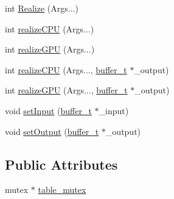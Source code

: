 \begin{DoxyCompactItemize}
int \hyperlink{class_fusion_1_1_dynamic_1_1_dynamic_dispatch_a9fafe72f2e1425c47f18bb3bab8601c4}{Realize} (Args...)
\item 
int \hyperlink{class_fusion_1_1_dynamic_1_1_dynamic_dispatch_a3e5d0db1df8ecf2376ef1a7073b3317f}{realize\-C\-P\-U} (Args...)
\item 
int \hyperlink{class_fusion_1_1_dynamic_1_1_dynamic_dispatch_a119f0f612ef66b521cb46dcdb2011b7a}{realize\-G\-P\-U} (Args...)
\item 
int \hyperlink{class_fusion_1_1_dynamic_1_1_dynamic_dispatch_a6a77f16d2d94f24a258619329b836495}{realize\-C\-P\-U} (Args..., \hyperlink{structbuffer__t}{buffer\-\_\-t} $\ast$\-\_\-output)
\item 
int \hyperlink{class_fusion_1_1_dynamic_1_1_dynamic_dispatch_adb32715cd6ad3be6db87589056a42e59}{realize\-G\-P\-U} (Args..., \hyperlink{structbuffer__t}{buffer\-\_\-t} $\ast$\-\_\-output)
\item 
void \hyperlink{class_fusion_1_1_dynamic_1_1_dynamic_dispatch_aa7a9f3d9a3a59ca49d4526dabfba3cbf}{set\-Input} (\hyperlink{structbuffer__t}{buffer\-\_\-t} $\ast$\-\_\-input)
\item 
void \hyperlink{class_fusion_1_1_dynamic_1_1_dynamic_dispatch_a8f26bf074900b28f551e5a2c9cd0ff1a}{set\-Output} (\hyperlink{structbuffer__t}{buffer\-\_\-t} $\ast$\-\_\-output)
\end{DoxyCompactItemize}
\subsection*{Public Attributes}
\begin{DoxyCompactItemize}
\item 
mutex $\ast$ \hyperlink{class_fusion_1_1_dynamic_1_1_dynamic_dispatch_a8416a4564562c331d2d9191526706302}{table\-\_\-mutex}
\end{DoxyCompactItemize}


